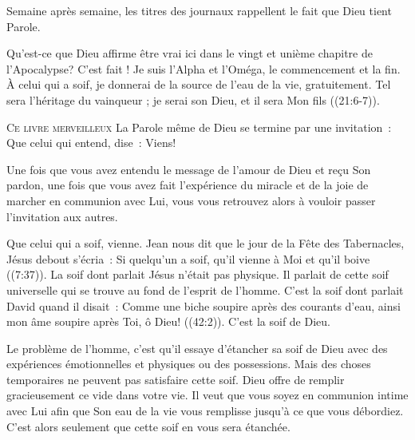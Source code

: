 Semaine après semaine, les titres des journaux rappellent le fait
 que Dieu tient Parole. 

Qu'est-ce que Dieu affirme être vrai ici dans le vingt et unième chapitre
 de l'Apocalypse?
 \og C'est fait ! Je suis l'Alpha et l'Oméga, le commencement et la fin.
 À celui qui a soif, je donnerai de la source de l'eau de la vie,
 gratuitement. Tel sera l'héritage du vainqueur ;
 je serai son Dieu, et il sera Mon fils \fg{} ((21:6-7)).

\dvrule






\lettrine{C}{e livre merveilleux}
 \ocadr La Parole même de Dieu \fcadr{}
 se termine par une invitation~: 
 \og Que celui qui entend, dise~: 
 \og Viens! \fg{} 

Une fois que vous avez entendu le message de l'amour de Dieu
 et reçu Son pardon, une fois que vous avez fait l'expérience
 du miracle et de la joie de marcher en communion avec Lui,
 vous vous retrouvez alors à vouloir passer l'invitation aux autres. 

\og Que celui qui a soif, vienne. \fg{}
 Jean nous dit que le jour de la Fête des Tabernacles,
 Jésus debout s'écria~:
 \og Si quelqu'un a soif, qu'il vienne à Moi et qu'il boive \fg{}
 ((7:37)).
 La soif dont parlait Jésus n'était pas physique.
 Il parlait de cette soif universelle qui se trouve au fond
 de l'esprit de l'homme. C'est la soif dont parlait David
 quand il disait~: 
 \og Comme une biche soupire après des courants d'eau,
 ainsi mon âme soupire après Toi, ô Dieu! \fg{} ((42:2)).
 C'est la soif de Dieu. 

Le problème de l'homme, c'est qu'il essaye d'étancher sa soif de Dieu
 avec des expériences émotionnelles et physiques ou des possessions.
 Mais des choses temporaires ne peuvent pas satisfaire cette soif.
 Dieu offre de remplir gracieusement ce vide dans votre vie.
 Il veut que vous soyez en communion intime avec Lui
 afin que Son eau de la vie vous remplisse jusqu'à ce que vous débordiez.
 C'est alors seulement que cette soif en vous sera étanchée. 

